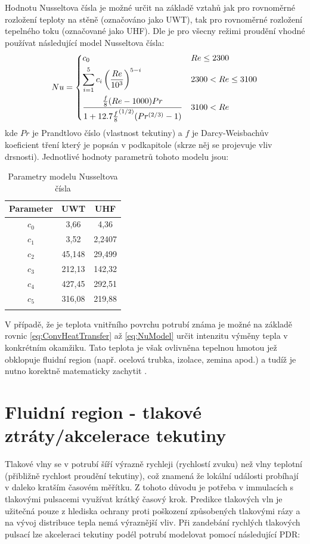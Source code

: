 Hodnotu Nusseltova čísla je možné určit na základě vztahů jak pro rovnoměrné 
rozložení teploty na stěně (označováno jako UWT), tak pro rovnoměrné rozložení
tepelného toku (označované jako UHF). Dle \cite{Abraham2009} je pro všecny
režimi proudění vhodné používat následující model Nusseltova čísla:
\begin{equation}
\label{eq:NuModel}
  Nu = 
  \begin{dcases}
    c_0 & Re\leq 2300 \\
    \sum_{i=1}^{5} c_i\left(\frac{Re}{10^3}\right)^{5-i} & 2300 < Re\le 3100 \\
    \frac{\frac{f}{8}(Re-1000)Pr}
    {1+12.7{\frac{f}{8}}^{(1/2)}(Pr^{(2/3)}-1)} & 3100 < Re
  \end{dcases} 
\end{equation}
kde \(Pr\) je Prandtlovo číslo (vlastnost tekutiny) a \(f\) je Darcy-Weisbachův 
koeficient tření který je popsán v podkapitole  (skrze něj 
se projevuje vliv drsnosti). Jednotlivé hodnoty parametrů tohoto modelu jsou:
\begin{table}[H]
  \label{tab:NuModel}
  \caption{Parametry modelu Nusseltova čísla}
  \vskip6pt
  \centering
  \begin{tabular}{ccc}
    \toprule
    Parameter & UWT & UHF \\ [0.5ex]
    \hline
    \(c_0\) & 3,66 & 4,36 \\ 
    \(c_1\) & 3,52 & 2,2407 \\
    \(c_2\) & 45,148 & 29,499 \\
    \(c_3\) & 212,13 & 142,32 \\
    \(c_4\) & 427,45 & 292,51 \\
    \(c_5\) & 316,08 & 219,88 \\
    \bottomrule \\[0.1mm]
  \end{tabular}
\end{table}
V případě, že je teplota vnitřního povrchu potrubí známa je možné na základě 
rovnic \ref{eq:ConvHeatTransfer} až \ref{eq:NuModel} určit intenzitu výměny 
tepla v konkrétním okamžiku. Tato teplota je však ovlivněna tepelnou hmotou jež 
obklopuje fluidní region (např. ocelová trubka, izolace, zemina apod.) a tudíž 
je nutno korektně matematicky zachytit .

\section{Fluidní region - tlakové ztráty/akcelerace tekutiny}
Tlakové vlny se v potrubí šíří výrazně rychleji (rychlostí zvuku) než vlny 
teplotní (přibližně rychlost proudění tekutiny), což znamená že lokální
události probíhají v daleko kratším časovém měřítku. Z tohoto důvodu je potřeba
v immulacích s tlakovými pulsacemi využívat krátký časový krok. Predikce 
tlakových vln je užitečná pouze z hlediska ochrany proti poškození způsobených 
tlakovými rázy a na vývoj distribuce tepla nemá výraznější vliv.
Při zandebání rychlých tlakových pulsací lze akceleraci tekutiny podél potrubí
modelovat pomocí následující PDR:

